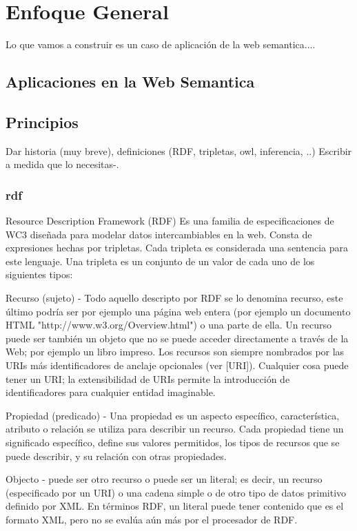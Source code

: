\chapter{Enfoque General}
\label{chapter:estrategia}

Lo que vamos a construir es un caso de aplicación de la web semantica....

\section{Aplicaciones en la Web Semantica}
\section{Principios}
Dar historia (muy breve), definiciones  (RDF, tripletas, owl, inferencia, ..)
Escribir a medida que lo necesitas-.

\subsection{rdf}
Resource Description Framework (RDF)
Es una familia de especificaciones de WC3 diseñada para modelar datos intercambiables en la web. 
Consta de expresiones hechas por tripletas. Cada tripleta es considerada una sentencia para este lenguaje.
Una tripleta es un conjunto de un valor de cada uno de los siguientes tipos:

Recurso (sujeto) - Todo aquello descripto por RDF se lo denomina recurso, este último podría ser por ejemplo una página web entera (por ejemplo 
un documento HTML "http://www.w3.org/Overview.html") o una parte de ella.  Un recurso puede ser también un objeto que no 
se puede acceder directamente a través de la Web; por ejemplo un libro impreso. Los recursos son siempre nombrados por las 
URIs más identificadores de anclaje opcionales (ver [URI]). Cualquier cosa puede tener un URI; la extensibilidad de URIs 
permite la introducción de identificadores para cualquier entidad imaginable.

Propiedad (predicado) - Una propiedad es un aspecto específico, característica, atributo o relación se utiliza para describir un recurso. 
Cada propiedad tiene un significado específico, define sus valores permitidos, los tipos de recursos que se puede describir, 
y su relación con otras propiedades. 

Objecto - puede ser otro recurso o puede ser un literal; es decir, un recurso (especificado por un URI) o una cadena simple o 
de otro tipo de datos primitivo definido por XML. En términos RDF, un literal puede tener contenido que es el formato XML,
pero no se evalúa aún más por el procesador de RDF.

